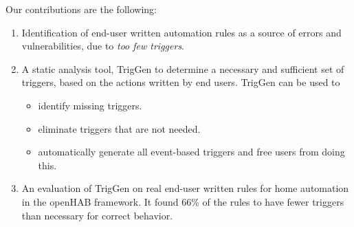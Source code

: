 \documentclass{sig-alternate-05-2015}
\begin{document}
Our contributions are the following:
\begin{enumerate}[topsep=0pt,itemsep=-1ex]
\item Identification of end-user written automation rules as a source of
  errors and vulnerabilities, due to \textit{too few triggers}.
\item A static analysis tool, TrigGen to determine a necessary and sufficient set of
  triggers, based on the actions written by end users.
  TrigGen can be used to
\begin{itemize}[topsep=-10pt,itemsep=-1ex,partopsep=1ex,parsep=1ex]
\item identify missing triggers. 
\item eliminate triggers that are not needed.
\item automatically generate all event-based triggers and free users from doing this.
\end{itemize}
\item An evaluation of TrigGen on real end-user written rules for home
  automation in the openHAB framework. It found 66\% of the rules to have fewer triggers than necessary for correct behavior. 
\end{enumerate}
\end{document}
